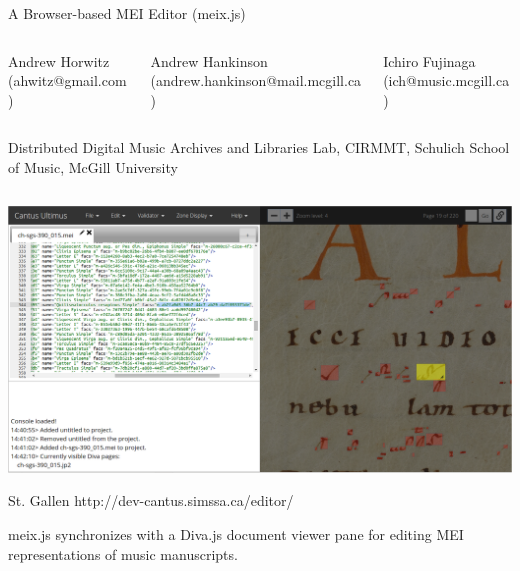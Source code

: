 \documentclass[pdf, ignorenonframetext]{beamer}
\begin{document}
\begin{frame}{A Browser-based MEI Editor (meix.js)}
\vspace{0.37cm}
	\begin{columns}
	\scriptsize
		\begin{column}{0.2\textwidth}
	    Andrew Horwitz \\(ahwitz@gmail.com)
	    \end{column}
	    \begin{column}{0.35\textwidth}
	    Andrew Hankinson \\(andrew.hankinson@mail.mcgill.ca)
	    \end{column}
	    \begin{column}{0.2\textwidth}
	    Ichiro Fujinaga \\(ich@music.mcgill.ca)
	    \end{column}
	\end{columns}

	\vspace{\baselineskip}
	\vspace{-0.5cm}
	\tiny
	\begin{center}
	Distributed Digital Music Archives and Libraries Lab, CIRMMT, Schulich School of Music, McGill University
	\end{center}

	\vspace{-1cm}

	\begin{block}{}
		\scriptsize
        \begin{columns}
        \begin{column}{\textwidth}
            \begin{block}{}
                \centering
                \includegraphics[scale=0.15]{mei_editor_diva}
	            \begin{block}{St. Gallen}
	    			\vspace{.5\baselineskip}
	                http://dev-cantus.simssa.ca/editor/
	    			\vspace{\baselineskip}
	    
	           		meix.js synchronizes with a Diva.js document viewer pane for editing MEI representations of music manuscripts.
	            \end{block}
            \end{block}
        \end{column}
        \end{columns}
    \end{block}
\end{frame}
\end{document}
